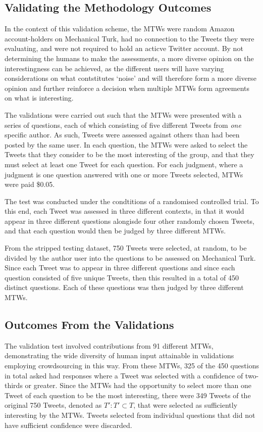 \subsection{Validating the Methodology Outcomes}
In the context of this validation scheme, the MTWs were random Amazon account-holders on Mechanical Turk, had no connection to the Tweets they were evaluating, and were not required to hold an acticve Twitter account. By not determining the humans to make the assessments, a more diverse opinion on the interestingness can be achieved, as the different users will have varying considerations on what contstitutes `noise' and will therefore form a more diverse opinion and further reinforce a decision when multiple MTWs form agreements on what is interesting. 

The validations were carried out such that the MTWs were presented with a series of questions, each of which consisting of five different Tweets from \textit{one} specific author. As such, Tweets were assessed against others than had been posted by the same user. In each question, the MTWs were asked to select the Tweets that they consider to be the most interesting of the group, and that they must select at least one Tweet for each question. For each judgment, where a judgment is one question answered with one or more Tweets selected, MTWs were paid \$0.05.

The test was conducted under the condtitions of a randomised controlled trial. To this end, each Tweet was assessed in three different contexts, in that it would appear in three different questions alongisde four other randomly chosen Tweets, and that each question would then be judged by three different MTWs.

From the stripped testing dataset, 750 Tweets were selected, at random, to be divided by the author user into the questions to be assessed on Mechanical Turk. Since each Tweet was to appear in three different questions and since each question consisted of five unique Tweets, then this resulted in a total of 450 distinct questions. Each of these questions was then judged by three different MTWs.


\subsection{Outcomes From the Validations}
The validation test involved contributions from 91 different MTWs, demonstrating the wide diversity of human input attainable in validations employing crowdsourcing in this way. From these MTWs, 325 of the 450 questions in total asked had responses where a Tweet was selected with a confidence of two-thirds or greater. Since the MTWs had the opportunity to select more than one Tweet of each question to be the most interesting, there were 349 Tweets of the original 750 Tweets, denoted as $T' : T' \subset T$, that were selected as sufficiently interesting by the MTWs. Tweets selected from individual questions that did not have sufficient confidence were discarded.

